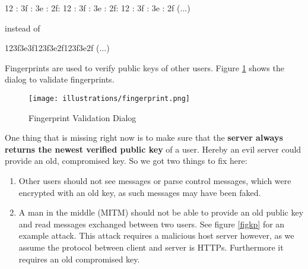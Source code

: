 \documentclass{scrartcl}
\begin{document}
   \begin{center}
   12 : 3f : 3e : 2f: 12 : 3f : 3e : 2f: 12 : 3f : 3e : 2f (...)
   \end{center}
  
  instead of 
  
  \begin{center}
  123f3e3f123f3e2f123f3e2f (...)
  \end{center}
  
  Fingerprints are used to verify public keys of other users.
  Figure \ref{figFP} shows the dialog to validate fingerprints.\\
  
  \begin{figure}[ht]
	\centering
  \texttt{[image: illustrations/fingerprint.png]}
	\caption{Fingerprint Validation Dialog}
	\label{figFP}
\end{figure}


One thing that is missing right now is to make sure that the \textbf{server always returns the newest verified public key} of a user. Hereby an evil server could provide an old, compromised key. So we got two things to fix here:
\begin{enumerate}
\item Other users should not see messages or parse  control messages, which were encrypted with an old key, as such messages may have been faked.
\item A man in the middle (MITM) should not be able to provide an old public key and read messages exchanged between two users. See figure \ref{figkp} for an example attack. This attack requires a malicious host server however, as we assume the protocol between client and server is HTTPs. Furthermore it requires an old compromised key.
\end {enumerate}
\end{document}
